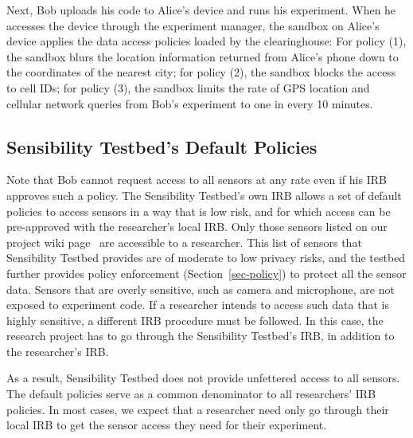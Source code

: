 Next, Bob uploads his code to Alice's device and 
runs his experiment. When he accesses the device through
the experiment manager, the sandbox on Alice's device 
applies the data access policies loaded by the clearinghouse: For 
policy (1), the sandbox blurs the location
information returned from Alice's phone down to the coordinates
of the nearest city; for policy (2), the sandbox blocks the
access to cell IDs; for policy (3), the sandbox limits the rate
of GPS location and cellular network queries from Bob's
experiment to one in every 10 minutes.

\subsection{Sensibility Testbed's Default Policies}\label{sec-irb-policies}

%
%
Note that Bob cannot request access to all sensors at any rate
even if his IRB approves such a policy. The Sensibility Testbed's
own IRB allows a set of default policies to access sensors in a
way that is low risk, and for which access can be pre-approved with the
researcher's local IRB. Only those sensors listed on our project 
wiki page~\cite{sensor-api} are accessible to a researcher. 
This list of sensors that Sensibility Testbed provides are of moderate 
to low privacy risks, and the testbed further provides policy enforcement
(Section~\ref{sec-policy}) to protect all the sensor data. Sensors 
that are overly sensitive, such as camera and microphone, are not 
exposed to experiment code. If a researcher intends to access such 
data that is highly sensitive, a different IRB procedure must be followed. 
In this case, the research project has to go through the Sensibility 
Testbed's IRB, in addition to the researcher's IRB. 



As a result, Sensibility Testbed does not
provide unfettered access to all sensors. 
The default policies serve as a common denominator to all 
researchers' IRB policies. In most cases, we expect
that a researcher need only go through their local IRB to get
the sensor access they need for their experiment. 
